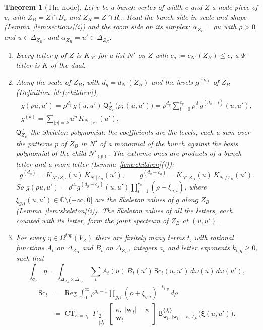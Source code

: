 \documentclass[11pt]{article}
\theoremstyle{plain}
\newtheorem{theorem}{Theorem}
\theoremstyle{definition}
\theoremstyle{remark}
\newcommand{\tsig}{\widetilde\sigma}
\newcommand{\sB}{\mathsf B}
\newcommand{\sQ}{\mathsf Q}
\newcommand{\Gst}[4]{\Gamma_{\substack{#1\\#2}}\!\begin{bmatrix}#3\\#4\end{bmatrix}}
\DeclareMathOperator{\Reg}{Reg}
\DeclareMathOperator*{\CT}{CT}
\begin{document}
\begin{theorem}[The node]\label{thm:B}
Let $v$ be a bunch vertex of width $c$ and $Z$ a node piece of $v$, with $Z_B=Z\cap B_v$ and $Z_R=Z\cap R_v$. Read the bunch side in scale and shape (Lemma~\ref{lem:sections}(i)) and the room side on its simplex: $\alpha_{Z_B}=\rho u$ with $\rho>0$ and $u\in\Delta_{Z_B}$, and $\alpha_{Z_R}=u'\in\Delta_{Z_R}$.
\begin{enumerate}[label=(\roman*)]
\item Every letter $g$ of $Z$ is $K_{N'}$ for a list $N'$ on $Z$ with $c_g:=c_{N'}(Z_B)\le c$; a $\Psi$-letter is $K$ of the dual.
\item Along the scale of $Z_B$, with $d_g=d_{N'}(Z_B)$ and the levels $g^{(k)}$ of $Z_B$ (Definition~\ref{def:children}),
\begin{gather*}
g(\rho u,u')=\rho^{d_g}\,g(u,u')\,\sQ^{g}_{Z_B}\big(\rho;(u,u')\big)=\rho^{d_g}\sum_{l=0}^{c_g}\rho^{\,l}\,g^{(d_g+l)}(u,u'),\\
g^{(k)}=\sum_{|p|=k}u^p\,K_{N'_{(p)}}(u'),
\end{gather*}
$\sQ^g_{Z_B}$ the Skeleton polynomial: the coefficients are the levels, each a sum over the patterns $p$ of $Z_B$ in $N'$ of a monomial of the bunch against the basis polynomial of the child $N'_{(p)}$. The extreme ones are products of a bunch letter and a room letter (Lemma~\ref{lem:children}(i)):
\[
g^{(d_g)}=K_{N'/Z_R}(u)\,K_{N'|Z_R}(u'),\qquad g^{(d_g+c_g)}=K_{N'|Z_B}(u)\,K_{N'/Z_B}(u').
\]
So $g(\rho u,u')=\rho^{d_g}g^{(d_g+c_g)}(u,u')\prod_{i=1}^{c_g}(\rho+\xi_{g,i})$, where $\xi_{g,i}(u,u')\in\mathbb C\setminus(-\infty,0]$ are the Skeleton values of $g$ along $Z_B$ (Lemma~\ref{lem:skeleton}(i)). The Skeleton values of all the letters, each counted with its letter, form the \emph{joint spectrum} of $Z_B$ at $(u,u')$.
\item For every $\eta\in\Omega^{top}(V_Z)$ there are finitely many terms $t$, with rational functions $A_t$ on $\Delta_{Z_B}$ and $B_t$ on $\Delta_{Z_R}$, integers $a_t$ and letter exponents $k_{t,g}\ge0$, such that
\[
\int_{\tsig_Z}\eta=\int_{\Delta_{Z_B}\times\Delta_{Z_R}}\sum_tA_t(u)\,B_t(u')\,\mathrm{Sc}_t(u,u')\,d\omega(u)\,d\omega(u'),
\]
\begin{align*}
\mathrm{Sc}_t&=\Reg\!\int_0^\infty\rho^{a_t-1}\prod_{g,i}(\rho+\xi_{g,i})^{-k_{t,g}}\,d\rho\\
&=\CT_{\kappa=a_t}\ \Gst2{|J_t|}{\kappa,\ |\mathbf w_t|-\kappa}{\mathbf w_t}\ \sB^{\{J_t\}}_{\mathbf w_t,\,|\mathbf w_t|-\kappa;\,I_{J_t}}\big(\boldsymbol\xi(u,u')\big).
\end{align*}

\end{enumerate}
\end{theorem}
\end{document}
